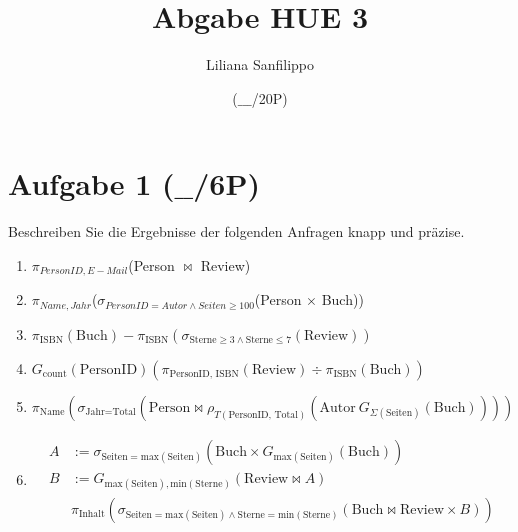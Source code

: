 \documentclass{article}
\title{Abgabe HUE 3}
\author{Liliana Sanfilippo}
\date{ {($\_\_\_$/20P)}}
\begin{document}
\maketitle 
\section*{Aufgabe 1 ($\_\_$/6P)}
Beschreiben Sie die Ergebnisse der folgenden Anfragen knapp und präzise. 
\begin{enumerate}
    \item $\pi_{PersonID, E-Mail}$(Person $\bowtie$ Review)
    \item $\pi_{Name, Jahr}$($\sigma_{PersonID=Autor \land Seiten\geq 100}$(Person $\times$ Buch))
    \item \(\pi_{\text{ISBN}}(\text{Buch}) - \pi_{\text{ISBN}}(\sigma_{\text{Sterne} \geq 3 \wedge \text{Sterne} \leq 7}(\text{Review}))\)
    \item \(G_{\text{count}}(\text{PersonID})(\pi_{\text{PersonID, ISBN}}(\text{Review}) \div \pi_{\text{ISBN}}(\text{Buch}))\)
    \item \(\pi_{\text{Name}}(\sigma_{\text{Jahr} = \text{Total}}(\text{Person} \bowtie \rho_{T(\text{PersonID, Total})}(\text{Autor} \ G_{\Sigma(\text{Seiten})}(\text{Buch}))))\)
    \item \[
\begin{aligned}
A &:= \sigma_{\text{Seiten} = \text{max}(\text{Seiten})}(\text{Buch} \times G_{\text{max}(\text{Seiten})}(\text{Buch})) \\
B &:= G_{\text{max}(\text{Seiten}), \text{min}(\text{Sterne})}(\text{Review} \bowtie A) \\
&\pi_{\text{Inhalt}}(\sigma_{\text{Seiten} = \text{max}(\text{Seiten}) \wedge \text{Sterne} = \text{min}(\text{Sterne})}(\text{Buch} \bowtie \text{Review} \times B))
\end{aligned}
\]
\end{enumerate}
\end{document}

